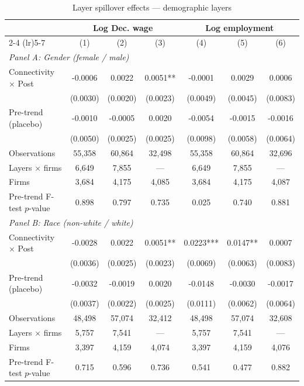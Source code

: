 \begin{table}[H]
\centering
\caption{Layer spillover effects --- demographic layers}
\label{tab:layer_specs_firm_demog}
\scriptsize
\begin{threeparttable}
\begin{tabular}{lcccccc}
\toprule\toprule
 & \multicolumn{3}{c}{Log Dec. wage} & \multicolumn{3}{c}{Log employment} \\
\cmidrule(lr){2-4} \cmidrule(lr){5-7}
 & (1) & (2) & (3) & (4) & (5) & (6) \\
\midrule
\multicolumn{7}{l}{\textit{Panel A: Gender (female / male)}} \\
\quad Connectivity $\times$ Post & -0.0006 & 0.0022 & 0.0051** & -0.0001 & 0.0029 & 0.0006 \\
 & (0.0030) & (0.0020) & (0.0023) & (0.0049) & (0.0045) & (0.0083) \\
\quad Pre-trend (placebo) & -0.0010 & -0.0005 & 0.0020 & -0.0054 & -0.0015 & -0.0016 \\
 & (0.0050) & (0.0025) & (0.0025) & (0.0098) & (0.0058) & (0.0064) \\
\quad Observations & 55,358 & 60,864 & 32,498 & 55,358 & 60,864 & 32,696 \\
\quad Layers $\times$ firms & 6,649 & 7,855 & --- & 6,649 & 7,855 & --- \\
\quad Firms & 3,684 & 4,175 & 4,085 & 3,684 & 4,175 & 4,087 \\
\quad Pre-trend F-test $p$-value & 0.898 & 0.797 & 0.735 & 0.025 & 0.740 & 0.881 \\[6pt]
\multicolumn{7}{l}{\textit{Panel B: Race (non-white / white)}} \\
\quad Connectivity $\times$ Post & -0.0028 & 0.0022 & 0.0051** & 0.0223*** & 0.0147** & 0.0007 \\
 & (0.0036) & (0.0025) & (0.0023) & (0.0069) & (0.0063) & (0.0083) \\
\quad Pre-trend (placebo) & -0.0032 & -0.0019 & 0.0020 & -0.0148 & -0.0030 & -0.0017 \\
 & (0.0037) & (0.0022) & (0.0025) & (0.0111) & (0.0062) & (0.0064) \\
\quad Observations & 48,498 & 57,074 & 32,412 & 48,498 & 57,074 & 32,608 \\
\quad Layers $\times$ firms & 5,757 & 7,541 & --- & 5,757 & 7,541 & --- \\
\quad Firms & 3,397 & 4,159 & 4,074 & 3,397 & 4,159 & 4,076 \\
\quad Pre-trend F-test $p$-value & 0.715 & 0.596 & 0.736 & 0.541 & 0.477 & 0.882 \\

\end{tabular}
\end{threeparttable}
\end{table}
